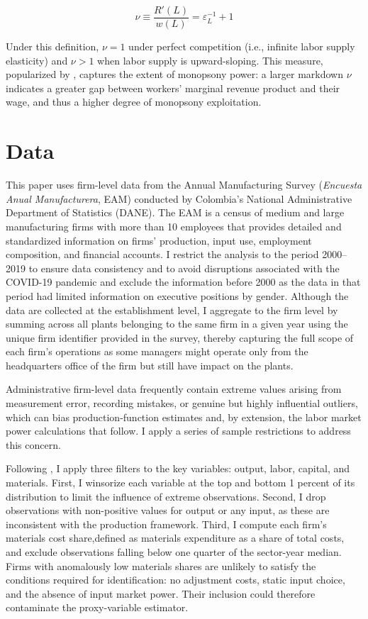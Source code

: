 \documentclass[12pt]{article}
\begin{document}
\begin{equation}
\nu \equiv \frac{R'(L)}{w(L)} = \varepsilon_L^{-1}+1
\end{equation}

Under this definition, $\nu = 1$ under perfect competition (i.e., infinite labor supply elasticity) and $\nu > 1$ when labor supply is upward-sloping. This measure, popularized by \textcite{manning_monopsony_2013}, captures the extent of monopsony power: a larger markdown $\nu$ indicates a greater gap between workers’ marginal revenue product and their wage, and thus a higher degree of monopsony exploitation.

\section{Data}\label{sec:data}

This paper uses firm-level data from the Annual Manufacturing Survey (\textit{Encuesta Anual Manufacturera}, EAM) conducted by Colombia's National Administrative Department of Statistics (DANE). The EAM is a census of medium and large manufacturing firms with more than 10 employees that provides detailed and standardized information on firms' production, input use, employment composition, and financial accounts. I restrict the analysis to the period 2000--2019 to ensure data consistency and to avoid disruptions associated with the COVID-19 pandemic and exclude the information before 2000 as the data in that period had limited information on executive positions by gender. Although the data are collected at the establishment level, I aggregate to the firm level by summing across all plants belonging to the same firm in a given year using the unique firm identifier provided in the survey, thereby capturing the full scope of each firm's operations as some managers might operate only from the headquarters office of the firm but still have impact on the plants.
 
Administrative firm-level data frequently contain extreme values arising from  measurement error, recording mistakes, or genuine but highly influential outliers, which can bias production-function estimates and, by extension, the labor market power calculations that follow. I apply a series of sample restrictions to address this concern.

Following \textcite{yeh_monopsony_2022}, I apply three filters to the key variables: output, labor, capital, and materials. First, I winsorize each variable at the top and bottom 1 percent of its distribution to limit the influence of extreme observations. Second, I drop observations with non-positive values for output or any input, as these are inconsistent with the production framework. Third, I compute each firm's materials cost share,defined as materials expenditure as a share of total costs, and exclude observations falling below one quarter of the sector-year median. Firms with anomalously low materials shares are unlikely to satisfy the conditions required for identification: no adjustment costs, static input choice, and the absence of input market power. Their inclusion could therefore contaminate the proxy-variable estimator.
\end{document}
